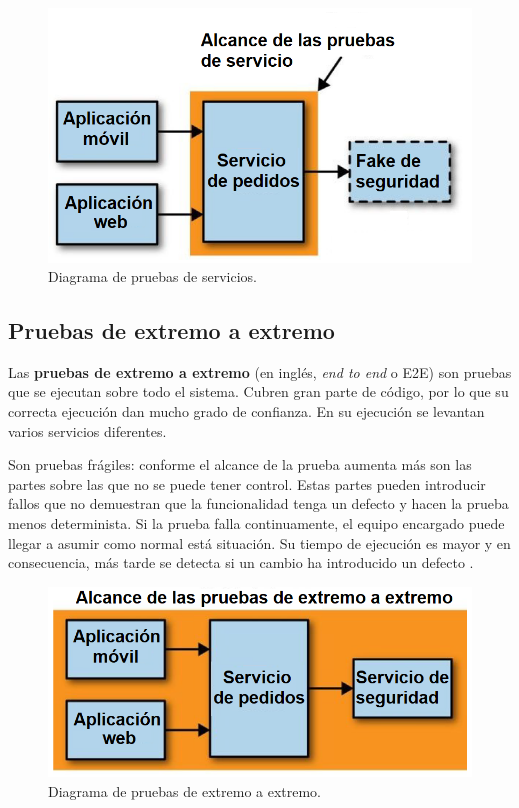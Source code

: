 \documentclass[11pt,spanish,listoffigures]{tfgetsinf}
\begin{document}
\begin{figure}[h]
\centering
\includegraphics[scale=0.5]{Service_Tests_ES}
\caption{Diagrama de pruebas de servicios.}
\end{figure}

\subsection{Pruebas de extremo a extremo}

Las \textbf{pruebas de extremo a extremo} (en inglés, \textit{end to end} o E2E) \cite{Newman2015a} son pruebas que se ejecutan sobre todo el sistema. Cubren gran parte de código, por lo que su correcta ejecución dan mucho grado de confianza. En su ejecución se levantan varios servicios diferentes.

Son pruebas frágiles: conforme el alcance de la prueba aumenta más son las partes sobre las que no se puede tener control. Estas partes pueden introducir fallos que no demuestran que la funcionalidad tenga un defecto y hacen la prueba menos determinista. Si la prueba falla continuamente, el equipo encargado puede llegar a asumir como normal está situación. Su tiempo de ejecución es mayor y en consecuencia, más tarde se detecta si un cambio ha introducido un defecto \cite{Newman2015a}.

\begin{figure}[h]
\centering
\includegraphics[scale=0.5]{End_To_End_Test_ES}
\caption{Diagrama de pruebas de extremo a extremo.}
\end{figure}
\end{document}
